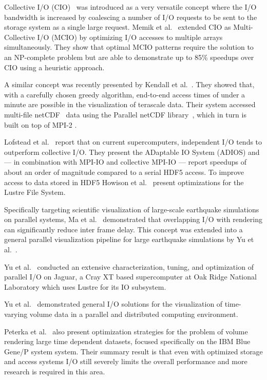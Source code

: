 Collective I/O (CIO)~\cite{Nitzberg:1995:PIO, Seamons:1995:SDCI,
Kotz:1997:DIMF} was introduced as a very versatile concept where the
I/O bandwidth is increased by coalescing a number of I/O requests to be
sent to the storage system as a single large request.
Memik et al.~\cite{Memik:2002:EIA} extended CIO as Multi-Collective
I/O (MCIO) by optimizing I/O accesses to multiple arrays
simultaneously. They show that optimal MCIO patterns require the
solution to an NP-complete problem but are able to demonstrate up to
85\% speedups over CIO using a heuristic approach.

A similar concept was recently presented by Kendall et
al.~\cite{Kendall:2009:TDO}. They showed that, with a carefully chosen
greedy algorithm, end-to-end access times of under a minute are
possible in the visualization of terascale data.  Their system accessed
multi-file netCDF~\cite{Rew:1990:NAIF} data using the Parallel netCDF
library~\cite{Li:2003:PNAH}, which in turn is built on top of MPI-2
\cite{Gropp:1998:MTCR}.

Lofstead et
al.~\cite{Lofstead:2008:FIAI,Lofstead:2009:AMRI,ADIOS:Manual} report
that on current supercomputers, independent I/O tends to outperform
collective I/O. They present the ADaptable IO System (ADIOS) and ---
in combination with MPI-IO and collective MPI-IO --- report speedups
of about an order of magnitude compared to a serial HDF5 access. To
improve access to data stored in HDF5
Howison et al.~\cite{Howison:2010:THFL} present optimizations for the
Lustre File System.

Specifically targeting scientific visualization of large-scale
earthquake simulations on parallel systems, Ma et
al.~\cite{Ma:2003:VVLS} demonstrated that overlapping I/O with
rendering can significantly reduce inter frame delay. This concept was
extended into a general parallel visualization pipeline for large
earthquake simulations by Yu et al.~\cite{Yu:2004:PVPF}.

Yu et al.~\cite{Yu:2008:PADP} conducted an extensive characterization,
tuning, and optimization of parallel I/O on Jaguar, a Cray XT based
supercomputer at Oak Ridge National Laboratory which uses Lustre
\cite{Sun:2008:PSIW} for its IO subsystem.

Yu et al.~\cite{Yu:2004:ISFP} demonstrated general I/O solutions
for the visualization of time-varying volume data in a parallel and
distributed computing environment.

Peterka et al.~\cite{Peterka:2009:ETES} also present optimization
strategies for the problem of volume rendering large time dependent
datasets, focused specifically on the IBM Blue Gene/P system
system. Their summary result is that even with optimized storage and
access systems I/O still severely limits the overall performance and
more research is required in this area.

